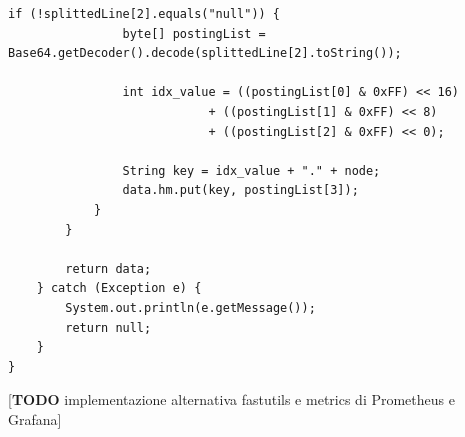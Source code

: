 \begin{lstlisting}[style=JavaStyle, caption=Implentazione con HashMap]
            if (!splittedLine[2].equals("null")) {
                byte[] postingList = Base64.getDecoder().decode(splittedLine[2].toString());

                int idx_value = ((postingList[0] & 0xFF) << 16)
                            + ((postingList[1] & 0xFF) << 8)
                            + ((postingList[2] & 0xFF) << 0);

                String key = idx_value + "." + node;
                data.hm.put(key, postingList[3]);
            }
        }

        return data;
    } catch (Exception e) {
        System.out.println(e.getMessage());
        return null;
    }
}
\end{lstlisting}

[\textbf{TODO} implementazione alternativa fastutils e metrics di Prometheus e Grafana]